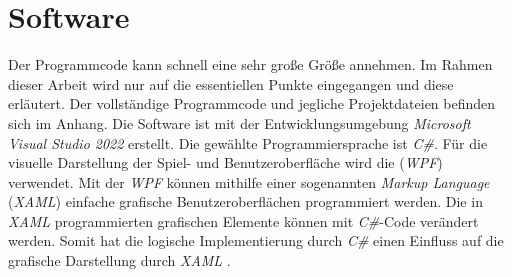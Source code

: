 
\chapter{Software}
Der Programmcode kann schnell eine sehr große Größe annehmen. Im Rahmen dieser Arbeit wird nur auf die essentiellen Punkte eingegangen und diese erläutert. Der vollständige Programmcode und jegliche Projektdateien befinden sich im Anhang. Die Software ist mit der Entwicklungsumgebung \textit{Microsoft Visual Studio 2022} erstellt. Die gewählte Programmiersprache ist \textit{C\#}. Für die visuelle Darstellung der Spiel- und Benutzeroberfläche wird die  (\textit{WPF}) verwendet. Mit der \textit{WPF} können mithilfe einer sogenannten \textit{Markup Language} (\textit{XAML}) einfache grafische Benutzeroberflächen programmiert werden. Die in \textit{XAML} programmierten grafischen Elemente können mit \textit{C\#}-Code verändert werden. Somit hat die logische Implementierung durch \textit{C\#} einen Einfluss auf die grafische Darstellung durch \textit{XAML} \cite{WPF}.
